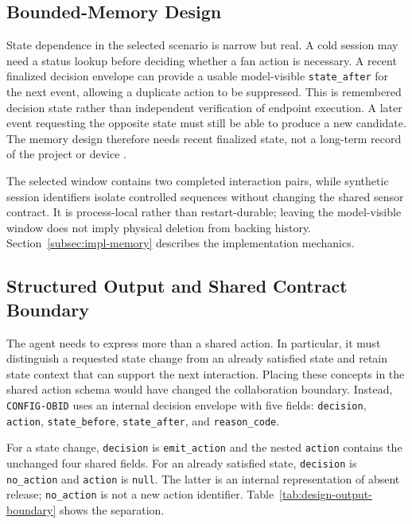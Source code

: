 \subsection{Bounded-Memory Design}\label{subsec:design-memory}

State dependence in the selected scenario is narrow but real. A cold session
may need a status lookup before deciding whether a fan action is necessary. A
recent finalized decision envelope can provide a usable model-visible
\mbox{\texttt{state\_after}} for the next event, allowing a duplicate action to be
suppressed. This is remembered decision state rather than independent
verification of endpoint execution. A later event requesting the opposite
state must still be able to produce a new candidate. The memory design therefore
needs recent finalized state, not a long-term record of the project or device
\cite{wang2024surveyagents,liu2024lostmiddle}.

The selected window contains two completed interaction pairs, while synthetic
session identifiers isolate controlled sequences without changing the shared
sensor contract. It is process-local rather than restart-durable; leaving the
model-visible window does not imply physical deletion from backing history.
Section~\ref{subsec:impl-memory} describes the implementation mechanics.

\subsection{Structured Output and Shared Contract Boundary}\label{subsec:design-output}

The agent needs to express more than a shared action. In particular, it must
distinguish a requested state change from an already satisfied state and retain
state context that can support the next interaction. Placing these concepts in
the shared action schema would have changed the collaboration boundary.
Instead, \texttt{CONFIG-OBID} uses an internal decision envelope with five
fields: \texttt{decision}, \texttt{action}, \mbox{\texttt{state\_before}},
\mbox{\texttt{state\_after}}, and \mbox{\texttt{reason\_code}}.

For a state change, \texttt{decision} is \mbox{\texttt{emit\_action}} and the nested
\texttt{action} contains the unchanged four shared fields. For an already
satisfied state, \texttt{decision} is \mbox{\texttt{no\_action}} and \texttt{action}
is \texttt{null}. The latter is an internal representation of absent release;
\mbox{\texttt{no\_action}} is not a new action identifier. Table~\ref{tab:design-output-boundary}
shows the separation.

